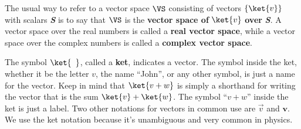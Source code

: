 The usual way to refer to a vector space $\VS$ consisting of vectors $\{\ket{v}\}$ with scalars \textit{\textbf{S}} is to say that $\VS$ is the \textbf{vector space of} $\ket{v}$ \textbf{over} \textit{\textbf{S}}.
A vector space over the real numbers is called a \textbf{real vector space}, while a vector space over the complex numbers is called a \textbf{complex vector space}.

The symbol $\ket{\phantom{v}}$, called a \textbf{ket}, indicates a vector.
The symbol inside the ket, whether it be the letter $v$, the name ``John'', or any other symbol, is just a name for the vector.
Keep in mind that $\ket{v+w}$ is simply a shorthand for writing the vector that is the sum $\ket{v} + \ket{w}$.
The symbol ``$v+w$'' inside the ket is just a label.
Two other notations for vectors in common use are $\vec{v}$ and $\mathbf{v}$.
We use the ket notation because it's unambiguous and very common in physics.

